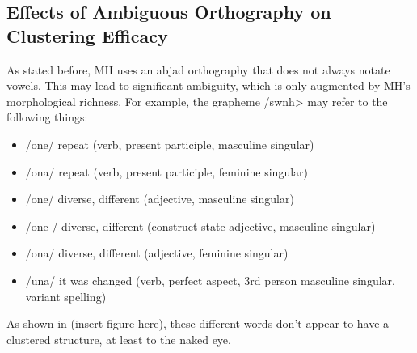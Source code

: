 \documentclass[10pt, a4paper]{article}
\begin{document}
\subsection{Effects of Ambiguous Orthography on Clustering Efficacy}
As stated before, MH uses an abjad orthography that does not always notate vowels. This may lead to significant ambiguity, which is only augmented by MH's morphological richness. For example, the grapheme \</swnh> may refer to the following things:
\begin{itemize}
    \item /\textesh one/ repeat (verb, present participle, masculine singular)
    \item /\textesh ona/ repeat (verb, present participle, feminine singular)
    \item /\textesh one/ diverse, different (adjective, masculine singular)
    \item /\textesh one-/ diverse, different (construct state adjective, masculine singular)
    \item /\textesh ona/ diverse, different (adjective, feminine singular)
    \item /\textesh una/ it was changed (verb, perfect aspect, 3rd person masculine singular, variant spelling)
\end{itemize}

As shown in (insert figure here), these different words don't appear to have a clustered structure, at least to the naked eye. 

\end{document}
